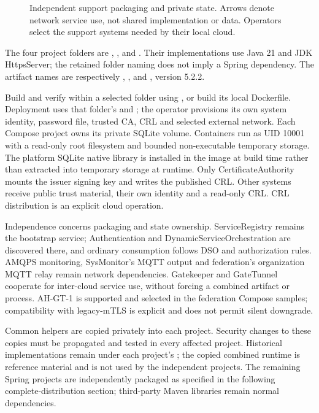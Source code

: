 \documentclass[a4paper]{arrowhead}
\begin{document}
\begin{figure}[htbp]
\centering

\caption{Independent support packaging and private state. Arrows denote network service use, not shared implementation or data. Operators select the support systems needed by their local cloud.}
\label{fig:independent-support}
\end{figure}

The four project folders are , ,  and . Their implementations use Java 21 and JDK HttpsServer; the retained folder naming does not imply a Spring dependency. The artifact names are respectively , ,  and , version 5.2.2.

Build and verify within a selected folder using , or build its local Dockerfile. Deployment uses that folder's  and ; the operator provisions its own system identity, password file, trusted CA, CRL and selected external network. Each Compose project owns its private SQLite volume. Containers run as UID 10001 with a read-only root filesystem and bounded non-executable temporary storage. The platform SQLite native library is installed in the image at build time rather than extracted into temporary storage at runtime. Only CertificateAuthority mounts the issuer signing key and writes the published CRL. Other systems receive public trust material, their own identity and a read-only CRL. CRL distribution is an explicit cloud operation.

Independence concerns packaging and state ownership. ServiceRegistry remains the bootstrap service; Authentication and DynamicServiceOrchestration are discovered there, and ordinary consumption follows DSO and authorization rules. AMQPS monitoring, SysMonitor's MQTT output and federation's organization MQTT relay remain network dependencies. Gatekeeper and GateTunnel cooperate for inter-cloud service use, without forcing a combined artifact or process. AH-GT-1 is supported and selected in the federation Compose samples; compatibility with legacy-mTLS is explicit and does not permit silent downgrade.

Common helpers are copied privately into each project. Security changes to these copies must be propagated and tested in every affected project. Historical implementations remain under each project's ; the copied combined runtime is reference material and is not used by the independent projects. The remaining Spring projects are independently packaged as specified in the following complete-distribution section; third-party Maven libraries remain normal dependencies.
\end{document}

